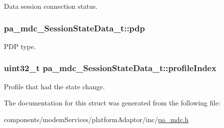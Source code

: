 Data session connection status. 

\subsubsection[{\texorpdfstring{pdp}{pdp}}]{ pa\+\_\+mdc\+\_\+\+Session\+State\+Data\+\_\+t\+::pdp}\hypertarget{structpa__mdc___session_state_data__t_a67bdd41e73229fa6f87a7fe5c939c79f}{}\label{structpa__mdc___session_state_data__t_a67bdd41e73229fa6f87a7fe5c939c79f}


P\+DP type. 

\subsubsection[{\texorpdfstring{profile\+Index}{profileIndex}}]{\setlength{\rightskip}{0pt plus 5cm}uint32\+\_\+t pa\+\_\+mdc\+\_\+\+Session\+State\+Data\+\_\+t\+::profile\+Index}\hypertarget{structpa__mdc___session_state_data__t_a6cd35123192754cb4a335c4fffcbf7bd}{}\label{structpa__mdc___session_state_data__t_a6cd35123192754cb4a335c4fffcbf7bd}


Profile that had the state change. 



The documentation for this struct was generated from the following file\+:\begin{DoxyCompactItemize}
\item 
components/modem\+Services/platform\+Adaptor/inc/\hyperlink{pa__mdc_8h}{pa\+\_\+mdc.\+h}\end{DoxyCompactItemize}
